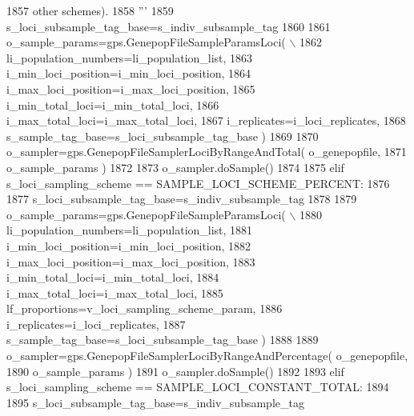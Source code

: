 \begin{DoxyCode}
1857 \textcolor{stringliteral}{            other schemes).}
1858 \textcolor{stringliteral}{            '''}
1859             s\_loci\_subsample\_tag\_base=s\_indiv\_subsample\_tag
1860 
1861             o\_sample\_params=gps.GenepopFileSampleParamsLoci( \(\backslash\)
1862                                         li\_population\_numbers=li\_population\_list,
1863                                         i\_min\_loci\_position=i\_min\_loci\_position,
1864                                         i\_max\_loci\_position=i\_max\_loci\_position,
1865                                         i\_min\_total\_loci=i\_min\_total\_loci,
1866                                         i\_max\_total\_loci=i\_max\_total\_loci,
1867                                         i\_replicates=i\_loci\_replicates,
1868                                         s\_sample\_tag\_base=s\_loci\_subsample\_tag\_base )
1869 
1870             o\_sampler=gps.GenepopFileSamplerLociByRangeAndTotal( o\_genepopfile,
1871                                                                     o\_sample\_params )
1872 
1873             o\_sampler.doSample()
1874 
1875         \textcolor{keywordflow}{elif} s\_loci\_sampling\_scheme == SAMPLE\_LOCI\_SCHEME\_PERCENT:
1876 
1877             s\_loci\_subsample\_tag\_base=s\_indiv\_subsample\_tag
1878 
1879             o\_sample\_params=gps.GenepopFileSampleParamsLoci( \(\backslash\)
1880                                                     li\_population\_numbers=li\_population\_list,
1881                                                     i\_min\_loci\_position=i\_min\_loci\_position,
1882                                                     i\_max\_loci\_position=i\_max\_loci\_position,
1883                                                     i\_min\_total\_loci=i\_min\_total\_loci,
1884                                                     i\_max\_total\_loci=i\_max\_total\_loci,
1885                                                     lf\_proportions=v\_loci\_sampling\_scheme\_param,
1886                                                     i\_replicates=i\_loci\_replicates,
1887                                                     s\_sample\_tag\_base=s\_loci\_subsample\_tag\_base )
1888 
1889             o\_sampler=gps.GenepopFileSamplerLociByRangeAndPercentage( o\_genepopfile,
1890                                                                     o\_sample\_params )
1891             o\_sampler.doSample()
1892 
1893         \textcolor{keywordflow}{elif} s\_loci\_sampling\_scheme == SAMPLE\_LOCI\_CONSTANT\_TOTAL:
1894 
1895             s\_loci\_subsample\_tag\_base=s\_indiv\_subsample\_tag

\end{DoxyCode}
